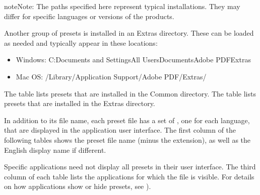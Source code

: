 \documentclass[letterpaper,12pt,english,openany,oneside]{sphinxmanual}
\begin{document}
\begin{sphinxadmonition}{note}{Note:}
The paths specified here represent typical installations. They may differ for specific languages or versions of the products.
\end{sphinxadmonition}

Another group of presets is installed in an Extras directory. These can be loaded as needed and typically appear in these locations:
\begin{itemize}
\item {} 
Windows: C:Documents and SettingsAll UsersDocumentsAdobe PDFExtras

\item {} 
Mac OS: /Library/Application Support/Adobe PDF/Extras/

\end{itemize}

The table  lists presets that are installed in the Common directory. The table  lists presets that are installed in the Extras directory.

In addition to its file name, each preset file has a set of  , one for each language, that are displayed in the application user interface. The first column of the following tables shows the preset file name (minus the  extension), as well as the English display name if different.

Specific applications need not display all presets in their user interface. The third column of each table lists the applications for which the file is visible. For details on how applications show or hide presets, see ).
\end{document}

